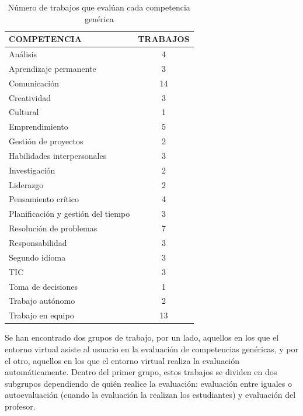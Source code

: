 \begin{table}
  \begin{center}
  \begin{tabular}{| m{10cm} | c |}
    \hline
    COMPETENCIA & TRABAJOS\\
    \hline
    \hline
    Análisis & 4\\
    \hline
    Aprendizaje permanente & 3\\
    \hline
    Comunicación & 14\\
    \hline
    Creatividad & 3\\
    \hline
    Cultural & 1\\
    \hline
    Emprendimiento & 5\\
    \hline
    Gestión de proyectos & 2\\
    \hline
    Habilidades interpersonales & 3\\
    \hline
    Investigación & 2\\
    \hline
    Liderazgo & 2\\
    \hline
    Pensamiento crítico & 4\\
    \hline
    Planificación y gestión del tiempo & 3\\
    \hline
    Resolución de problemas & 7\\
    \hline
    Responsabilidad & 3\\
    \hline 
    Segundo idioma & 3\\
    \hline
    TIC & 3\\
    \hline
    Toma de decisiones & 1\\
    \hline
    Trabajo autónomo & 2\\
    \hline
    Trabajo en equipo & 13\\
    \hline
  \end{tabular}
\end{center}
\caption{Número de trabajos que evalúan cada competencia genérica}
\label{tab:TrabajosCompetencia}
\end{table} 


Se han encontrado dos grupos de trabajo, por un lado, aquellos en los que el entorno virtual asiste al usuario en la evaluación de competencias genéricas, y por el otro, aquellos en los que el entorno virtual realiza la evaluación automáticamente. Dentro del primer grupo, estos trabajos se dividen en dos subgrupos dependiendo de quién realice la evaluación: evaluación entre iguales o autoevaluación (cuando la evaluación la realizan los estudiantes) y evaluación del profesor.


